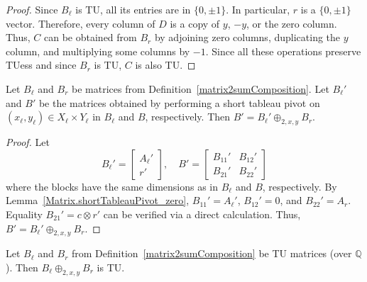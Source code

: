 \begin{proof}
    \leanok
    Since $B_{\ell}$ is TU, all its entries are in $\{0, \pm 1\}$. In particular, $r$ is a $\{0, \pm 1\}$ vector. Therefore, every column of $D$ is a copy of $y$, $-y$, or the zero column. Thus, $C$ can be obtained from $B_{r}$ by adjoining zero columns, duplicating the $y$ column, and multiplying some columns by $-1$. Since all these operations preserve TUess and since $B_{r}$ is TU, $C$ is also TU.
\end{proof}

\begin{lemma}
    \label{matrix2sumComposition_shortTableauPivot}
    \leanok
    Let $B_{\ell}$ and $B_{r}$ be matrices from Definition~\ref{matrix2sumComposition}. Let $B_{\ell}'$ and $B'$ be the matrices obtained by performing a short tableau pivot on $(x_{\ell}, y_{\ell}) \in X_{\ell} \times Y_{\ell}$ in $B_{\ell}$ and $B$, respectively. Then $B' = B_{\ell}' \oplus_{2, x, y} B_{r}$.
\end{lemma}

\begin{proof}
    \leanok
    Let
    \[
        B_{\ell}' = \begin{bmatrix} A_{\ell}' \\ r' \end{bmatrix}, \quad
        B' = \begin{bmatrix} B_{11}' & B_{12}' \\ B_{21}' & B_{22}' \end{bmatrix}
    \]
    where the blocks have the same dimensions as in $B_{\ell}$ and $B$, respectively. By Lemma~\ref{Matrix.shortTableauPivot_zero}, $B_{11}' = A_{\ell}'$, $B_{12}' = 0$, and $B_{22}' = A_{r}$. Equality $B_{21}' = c \otimes r'$ can be verified via a direct calculation. Thus, $B' = B_{\ell}' \oplus_{2, x, y} B_{r}$.
\end{proof}

\begin{lemma}
    \label{matrix2sumComposition_isTotallyUnimodular}
    \leanok
    Let $B_{\ell}$ and $B_{r}$ from Definition~\ref{matrix2sumComposition} be TU matrices (over $\mathbb{Q}$). Then $B_{\ell} \oplus_{2, x, y} B_{r}$ is TU.
\end{lemma}

